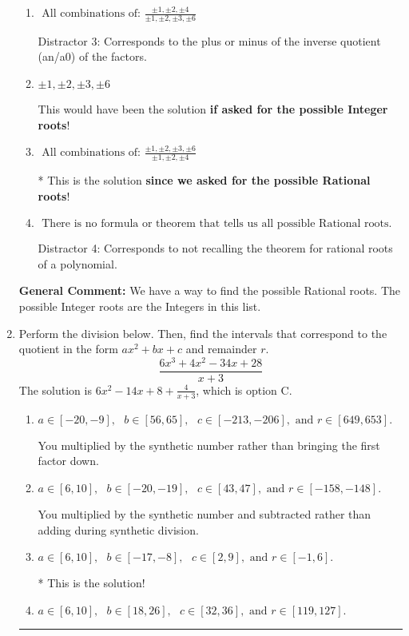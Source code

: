 \documentclass{extbook}[14pt]
\newcommand{\litem}[1]{\item #1

\rule{\textwidth}{0.4pt}}
\begin{document}
\begin{enumerate}
{\begin{enumerate}[label=\Alph*.]
 Distractor 1: Corresponds to the plus or minus factors of a1 only.
\item \( \text{ All combinations of: }\frac{\pm 1,\pm 2,\pm 4}{\pm 1,\pm 2,\pm 3,\pm 6} \)

 Distractor 3: Corresponds to the plus or minus of the inverse quotient (an/a0) of the factors. 
\item \( \pm 1,\pm 2,\pm 3,\pm 6 \)

This would have been the solution \textbf{if asked for the possible Integer roots}!
\item \( \text{ All combinations of: }\frac{\pm 1,\pm 2,\pm 3,\pm 6}{\pm 1,\pm 2,\pm 4} \)

* This is the solution \textbf{since we asked for the possible Rational roots}!
\item \( \text{ There is no formula or theorem that tells us all possible Rational roots.} \)

 Distractor 4: Corresponds to not recalling the theorem for rational roots of a polynomial.
\end{enumerate}

\textbf{General Comment:} We have a way to find the possible Rational roots. The possible Integer roots are the Integers in this list.
}
\litem{
Perform the division below. Then, find the intervals that correspond to the quotient in the form $ax^2+bx+c$ and remainder $r$.
\[ \frac{6x^{3} +4 x^{2} -34 x + 28}{x + 3} \]The solution is \( 6x^{2} -14 x + 8 + \frac{4}{x + 3} \), which is option C.\begin{enumerate}[label=\Alph*.]
\item \( a \in [-20, -9], \text{   } b \in [56, 65], \text{   } c \in [-213, -206], \text{   and   } r \in [649, 653]. \)

 You multiplied by the synthetic number rather than bringing the first factor down.
\item \( a \in [6, 10], \text{   } b \in [-20, -19], \text{   } c \in [43, 47], \text{   and   } r \in [-158, -148]. \)

 You multiplied by the synthetic number and subtracted rather than adding during synthetic division.
\item \( a \in [6, 10], \text{   } b \in [-17, -8], \text{   } c \in [2, 9], \text{   and   } r \in [-1, 6]. \)

* This is the solution!
\item \( a \in [6, 10], \text{   } b \in [18, 26], \text{   } c \in [32, 36], \text{   and   } r \in [119, 127]. \)


\end{enumerate}}
\end{enumerate}
\end{document}
